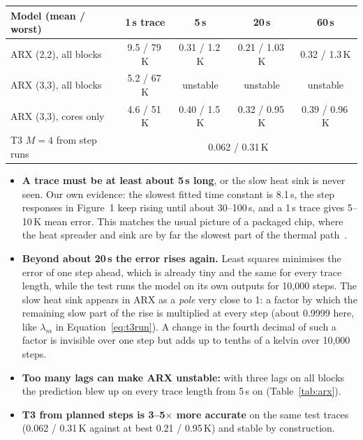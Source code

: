 \documentclass[11pt,a4paper]{article}
\begin{document}
\begin{center}
\small
\begin{tabular}{@{}l c c c c@{}}
\toprule
Model (mean / worst) & 1\,s trace & 5\,s & 20\,s & 60\,s \\
\midrule
ARX (2,2), all blocks & 9.5 / 79\,K & 0.31 / 1.2\,K & 0.21 / 1.03\,K & 0.32 / 1.3\,K \\
ARX (3,3), all blocks & 5.2 / 67\,K & unstable & unstable & unstable \\
ARX (3,3), cores only & 4.6 / 51\,K & 0.40 / 1.5\,K & 0.32 / 0.95\,K & 0.39 / 0.96\,K \\
T3 $M=4$ from step runs & \multicolumn{4}{c}{0.062 / 0.31\,K} \\
\bottomrule
\end{tabular}
\label{tab:arx}
\end{center}

\begin{itemize}
  \item \textbf{A trace must be at least about 5\,s long}, or the slow heat sink is never seen. Our
        own evidence: the slowest fitted time constant is 8.1\,s, the step responses in Figure~1
        keep rising until about 30--100\,s, and a 1\,s trace gives 5--10\,K mean error. This
        matches the usual picture of a packaged chip, where the heat spreader and sink are by far
        the slowest part of the thermal path~\cite{skadron03,hotspot}.
  \item \textbf{Beyond about 20\,s the error rises again.} Least squares minimises the error of one
        step ahead, which is already tiny and the same for every trace length, while the test runs
        the model on its own outputs for 10{,}000 steps. The slow heat sink appears in ARX as a
        \emph{pole} very close to 1: a factor by which the remaining slow part of the rise is
        multiplied at every step (about 0.9999 here, like $\lambda_m$ in
        Equation~\eqref{eq:t3run}). A change in the fourth decimal of such a factor is invisible
        over one step but adds up to tenths of a kelvin over 10{,}000 steps.
  \item \textbf{Too many lags can make ARX unstable:} with three lags on all blocks the prediction
        blew up on every trace length from 5\,s on (Table~\ref{tab:arx}).
  \item \textbf{T3 from planned steps is 3--5$\times$ more accurate} on the same test traces
        (0.062 / 0.31\,K against at best 0.21 / 0.95\,K) and stable by construction.
\end{itemize}
\end{document}

